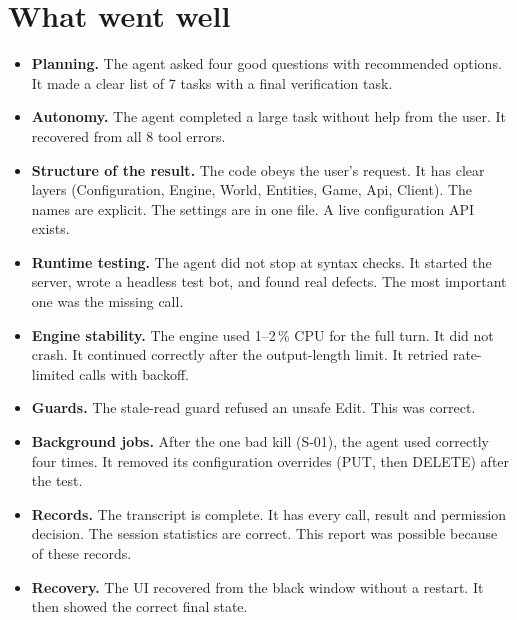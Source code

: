 \documentclass[11pt,a4paper]{article}
\newcommand{\code}[1]{\texttt{\detokenize{#1}}}
\begin{document}
\section{What went well}

\begin{itemize}
  \item[\textcolor{good}{+}] \textbf{Planning.} The agent asked four good
        questions with recommended options. It made a clear list of 7 tasks with
        a final verification task.
  \item[\textcolor{good}{+}] \textbf{Autonomy.} The agent completed a large task
        without help from the user. It recovered from all 8 tool errors.
  \item[\textcolor{good}{+}] \textbf{Structure of the result.} The code obeys the
        user's request. It has clear layers (Configuration, Engine, World,
        Entities, Game, Api, Client). The names are explicit. The settings are in
        one file. A live configuration API exists.
  \item[\textcolor{good}{+}] \textbf{Runtime testing.} The agent did not stop at
        syntax checks. It started the server, wrote a headless test bot, and
        found real defects. The most important one was the missing
        \code{Player.Update} call.
  \item[\textcolor{good}{+}] \textbf{Engine stability.} The engine used 1--2\,\%
        CPU for the full turn. It did not crash. It continued correctly after the
        output-length limit. It retried rate-limited calls with backoff.
  \item[\textcolor{good}{+}] \textbf{Guards.} The stale-read guard refused an
        unsafe Edit. This was correct.
  \item[\textcolor{good}{+}] \textbf{Background jobs.} After the one bad kill
        (S-01), the agent used \code{TaskStop} correctly four times. It removed
        its configuration overrides (PUT, then DELETE) after the test.
  \item[\textcolor{good}{+}] \textbf{Records.} The transcript is complete. It has
        every call, result and permission decision. The session statistics are
        correct. This report was possible because of these records.
  \item[\textcolor{good}{+}] \textbf{Recovery.} The UI recovered from the black
        window without a restart. It then showed the correct final state.
\end{itemize}
\end{document}
